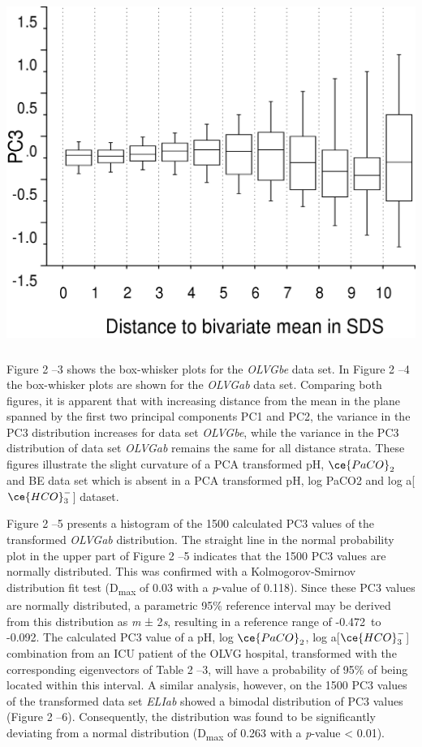 \documentclass[
  12pt,
  a4paperpaper,
]{report}
\begin{document}
\includegraphics[width=5.41944in,height=4.44722in]{figures/H_02_image2.png}

Figure 2 --3 shows the box-whisker plots for the \emph{OLVGbe} data set.
In Figure 2 --4 the box-whisker plots are shown for the \emph{OLVGab}
data set. Comparing both figures, it is apparent that with increasing
distance from the mean in the plane spanned by the first two principal
components PC1 and PC2, the variance in the PC3 distribution increases
for data set \emph{OLVGbe}, while the variance in the PC3 distribution
of data set \emph{OLVGab} remains the same for all distance strata.
These figures illustrate the slight curvature of a PCA transformed pH,
\(\ce{PaCO}_{2}\) and BE data set which is absent in a PCA transformed
pH, log PaCO2 and log a{[}\(\ce{HCO}_{3}^{-}\){]} dataset.

Figure 2 --5 presents a histogram of the 1500 calculated PC3 values of
the transformed \emph{OLVGab} distribution. The straight line in the
normal probability plot in the upper part of Figure 2 --5 indicates that
the 1500 PC3 values are normally distributed. This was confirmed with a
Kolmogorov-Smirnov distribution fit test (D\textsubscript{max} of 0.03
with a \emph{p}-value of 0.118). Since these PC3 values are normally
distributed, a parametric 95\% reference interval may be derived from
this distribution as \emph{m} ± 2\emph{s}, resulting in a reference
range of -0.472~to -0.092. The calculated PC3 value of a pH, log
\(\ce{PaCO}_{2}\), log a{[}\(\ce{HCO}_{3}^{-}\){]} combination from an
ICU patient of the OLVG hospital, transformed with the corresponding
eigenvectors of Table 2 --3, will have a probability of 95\% of being
located within this interval. A similar analysis, however, on the 1500
PC3 values of the transformed data set \emph{ELIab} showed a bimodal
distribution of PC3 values (Figure 2 --6). Consequently, the
distribution was found to be significantly deviating from a normal
distribution (D\textsubscript{max} of 0.263 with a \emph{p}-value
\textless{} 0.01).
\end{document}
